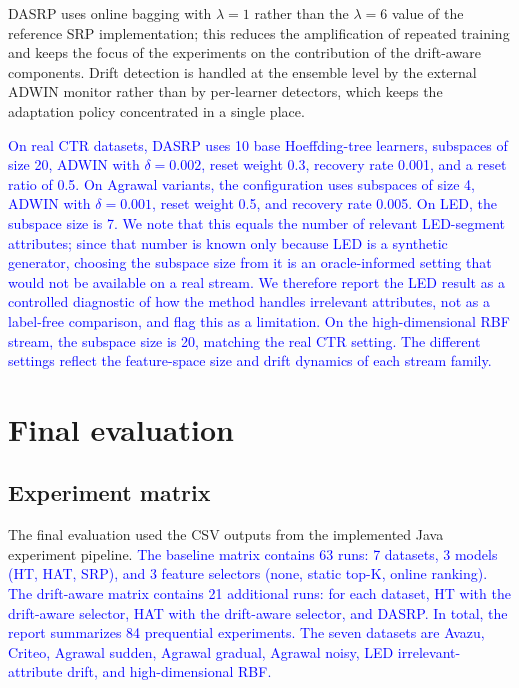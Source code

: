 \documentclass[12pt]{article}
\newcommand{\new}[1]{\textcolor{blue}{#1}}
\begin{document}
DASRP uses online bagging with $\lambda=1$ rather than
the $\lambda=6$ value of the reference SRP implementation; this reduces the
amplification of repeated training and keeps the focus of the experiments on
the contribution of the drift-aware components. Drift detection is handled at
the ensemble level by the external ADWIN monitor rather than by per-learner
detectors, which keeps the adaptation policy concentrated in a single place.

\new{On real CTR datasets, DASRP uses 10 base Hoeffding-tree learners,
subspaces of size 20, ADWIN with $\delta=0.002$, reset weight 0.3, recovery
rate 0.001, and a reset ratio of 0.5. On Agrawal variants, the configuration
uses subspaces of size 4, ADWIN with $\delta=0.001$, reset weight 0.5, and
recovery rate 0.005. On LED, the subspace size is 7. We note that this equals
the number of relevant LED-segment attributes; since that number is known only
because LED is a synthetic generator, choosing the subspace size from it is an
oracle-informed setting that would not be available on a real stream. We
therefore report the LED result as a controlled diagnostic of how the method
handles irrelevant attributes, not as a label-free comparison, and flag this as
a limitation. On the high-dimensional
RBF stream, the subspace size is 20, matching the real CTR setting. The
different settings reflect the feature-space size and drift dynamics of each
stream family.}

\section{Final evaluation}
\label{sec:eval}

\subsection{Experiment matrix}
\label{subsec:matrix}

The final evaluation used the CSV outputs from the implemented Java experiment
pipeline. \new{The baseline matrix contains 63 runs: 7 datasets, 3 models
(HT, HAT, SRP), and 3 feature selectors (none, static top-K, online ranking).
The drift-aware matrix contains 21 additional runs: for each dataset, HT with
the drift-aware selector, HAT with the drift-aware selector, and DASRP. In
total, the report summarizes 84 prequential experiments. The seven datasets are
Avazu, Criteo, Agrawal sudden, Agrawal gradual, Agrawal noisy, LED
irrelevant-attribute drift, and high-dimensional RBF.}
\end{document}
